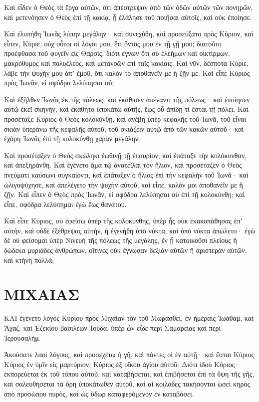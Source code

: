 \begin{spacing}{1.1}
\begin{multicols}{2}
Καὶ εἶδεν ὁ Θεὸς τὰ ἔργα αὐτῶν, ὅτι ἀπέστρεψαν ἀπὸ τῶν ὁδῶν αὐτῶν τῶν πονηρῶν, καὶ μετενόησεν ὁ Θεὸς ἐπὶ τῇ κακίᾳ, ᾗ ἐλάλησε τοῦ ποιῆσαι αὐτοῖς, καὶ οὐκ ἐποίησε.

Καὶ ἐλυπήθη Ἰωνᾶς λύπην μεγάλην· καὶ συνεχύθη,
καὶ προσεύξατο πρὸς Κύριον, καὶ εἶπεν, Κύριε, οὐχ οὗτοι οἱ λόγοι μου, ἔτι ὄντος μου ἐν τῇ γῇ μου; διατοῦτο προέφθασα τοῦ φυγεῖν εἰς Θαρσὶς, διότι ἔγνων ὅτι σὺ ἐλεήμων καὶ οἰκτίρμων, μακρόθυμος καὶ πολυέλεος, καὶ μετανοῶν ἐπὶ ταῖς κακίαις.
Καὶ νῦν, δέσποτα Κύριε, λάβε τὴν ψυχήν μου ἀπʼ ἐμοῦ, ὅτι καλὸν τὸ ἀποθανεῖν με ἢ ζῇν με.
Καὶ εἶπε Κύριος πρὸς Ἰωνᾶν, εἰ σφόδρα λελύπησαι σύ;

Καὶ ἐξῆλθεν Ἰωνᾶς ἐκ τῆς πόλεως, καὶ ἐκάθισεν ἀπέναντι τῆς πόλεως· καὶ ἐποίησεν αὐτῷ ἐκεῖ σκηνὴν, καὶ ἐκάθητο ὑποκάτω αὐτῆς, ἕως οὗ ἀπίδῃ τί ἔσται τῇ πόλει.
Καὶ προσέταξε Κύριος ὁ Θεὸς κολοκύνθῃ, καὶ ἀνέβη ὑπὲρ κεφαλῆς τοῦ Ἰωνᾶ, τοῦ εἶναι σκιὰν ὑπεράνω τῆς κεφαλῆς αὐτοῦ, τοῦ σκιάζειν αὐτῷ ἀπὸ τῶν κακῶν αὐτοῦ· καὶ ἐχάρη Ἰωνᾶς ἐπὶ τῇ κολοκύνθῃ χαρὰν μεγάλην.

Καὶ προσέταξεν ὁ Θεὸς σκώληκι ἑωθινῇ τῇ ἐπαυρίον, καὶ ἐπάταξε τὴν κολόκυνθαν, καὶ ἀπεξηράνθη.
Καὶ ἐγένετο ἅμα τῷ ἀνατεῖλαι τὸν ἥλιον, καὶ προσέταξεν ὁ Θεὸς πνεύματι καύσωνι συγκαίοντι, καὶ ἐπάταξεν ὁ ἥλιος ἐπὶ τὴν κεφαλὴν τοῦ Ἰωνᾶ· καὶ ὠλιγοψύχησε, καὶ ἀπελέγετο τὴν ψυχὴν αὐτοῦ, καὶ εἶπε, καλόν μοι ἀποθανεῖν με ἢ ζῇν.
Καὶ εἶπεν ὁ Θεὸς πρὸς Ἰωνᾶν, εἰ σφόδρα λελύπησαι σὺ ἐπὶ τῇ κολοκύνθῃ; καὶ εἶπε, σφόδρα λελύπημαι ἐγὼ ἕως θανάτου.

Καὶ εἶπε Κύριος, σὺ ἐφείσω ὑπὲρ τῆς κολοκύνθης, ὑπὲρ ἧς οὐκ ἐκακοπάθησας ἐπʼ αὐτὴν, καὶ οὐδὲ ἐξέθρεψας αὐτὴν, ἣ ἐγενήθη ὑπὸ νύκτα, καὶ ὑπὸ νύκτα ἀπώλετο·
ἐγὼ δὲ οὐ φείσομαι ὑπὲρ Νινευὴ τῆς πόλεως τῆς μεγάλης, ἐν ᾗ κατοικοῦσι πλείους ἢ δώδεκα μυριάδες ἀνθρώπων, οἵτινες οὐκ ἔγνωσαν δεξιὰν αὐτῶν ἢ ἀριστερὰν αὐτῶν, καὶ κτήνη πολλά;


\end{multicols}
\chapter{ΜΙΧΑΙΑΣ}
\begin{multicols}{2}

ΚΑΙ ἐγένετο λόγος Κυρίου πρὸς Μιχαίαν τὸν τοῦ Μωρασθεὶ, ἐν ἡμέραις Ἰωάθαμ, καὶ Ἄχαζ, καὶ Ἐζεκίου βασιλέων Ἰούδα, ὑπὲρ ὧν εἶδε περὶ Σαμαρείας καὶ περὶ Ἱερουσαλήμ.

Ἀκούσατε λαοὶ λόγους, καὶ προσεχέτω ἡ γῆ, καὶ πάντες οἱ ἐν αὐτῇ· καὶ ἔσται Κύριος Κύριος ἐν ὑμῖν εἰς μαρτύριον, Κύριος ἐξ οἴκου ἁγίου αὐτοῦ.
Διότι ἰδοὺ Κύριος ἐκπορεύεται ἐκ τοῦ τόπου αὐτοῦ, καὶ καταβήσεται, καὶ ἐπιβήσεται ἐπὶ τὰ ὕψη τῆς γῆς,
καὶ σαλευθήσεται τὰ ὄρη ὑποκάτωθεν αὐτοῦ, καὶ αἱ κοιλάδες τακήσονται ὡσεὶ κηρὸς ἀπὸ προσώπου πυρὸς, καὶ ὡς ὕδωρ καταφερόμενον ἐν καταβάσει.


\end{multicols}
\end{spacing}
